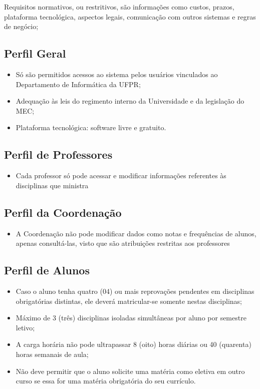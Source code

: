 \documentclass{book}
\begin{document}
Requisitos normativos, ou restritivos, são informações como custos, prazos, plataforma tecnológica, aspectos legais, comunicação com outros sistemas e regras de negócio;


\subsection{Perfil Geral}

\begin{itemize}
	
	\item Só são permitidos acessos ao sistema pelos usuários vinculados ao Departamento de Informática da UFPR;
	\item Adequação às leis do regimento interno da Universidade e da legislação do
MEC;
	\item Plataforma tecnológica: software livre e gratuito.
\end{itemize}


\subsection{Perfil de Professores}

\begin{itemize}
	\item Cada professor só pode acessar e modificar informações referentes às disciplinas que ministra
\end{itemize}


\subsection{Perfil da Coordenação}

\begin{itemize}
\item A Coordenação não pode modificar dados como notas e frequências de alunos, apenas consultá-las, visto que são atribuições restritas aos professores
\end{itemize}



\subsection{Perfil de Alunos}

\begin{itemize}
	\item Caso o aluno tenha quatro (04) ou mais reprovações pendentes em disciplinas obrigatórias distintas, ele
deverá matricular-se somente nestas disciplinas;
	\item Máximo de 3 (três) disciplinas isoladas simultâneas por aluno por semestre letivo;
	\item A carga horária não pode ultrapassar 8 (oito) horas diárias ou 40 (quarenta) horas semanais de aula;
	\item Não deve permitir que o aluno solicite uma matéria como eletiva em outro curso se essa for uma matéria obrigatória do seu currículo.
\end{itemize}
\end{document}
